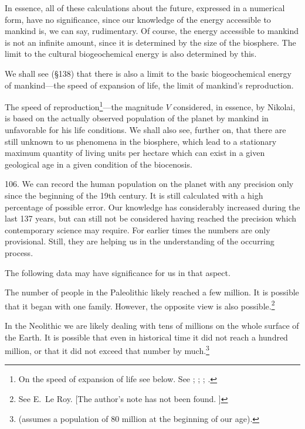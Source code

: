 In essence, all of these calculations about the future, expressed in a
numerical form, have no significance, since our knowledge of the energy
accessible to mankind is, we can say, rudimentary.  Of course, the energy
accessible to mankind is not an infinite amount, since it is determined by the
size of the biosphere.  The limit to the cultural biogeochemical energy is
also determined by this.

We shall see (§138) that there is also a limit to the basic biogeochemical
energy of mankind---the speed of expansion of life, the limit of mankind's
reproduction.

The speed of reproduction\footnote{
	On the speed of expansion of life see below.  See
	\foreignlanguage{french}{\cite{vernadsky1926etudes1}};
	\foreignlanguage{russian}{\cite[413--424, 437--444]{vernadsky1994zhivoe}};
	\foreignlanguage{russian}{\cite[118--125]{vernadsky1940biogeohimicheskie}};
	\foreignlanguage{russian}{\cite[Гл.~20]{vernadsky1965himicheskoe}.}
}---the magnitude $V$ considered, in essence, by Nikolai, is based on the
actually observed population of the planet by mankind in unfavorable for his
life conditions.  We shall also see, further on, that there are still unknown
to us phenomena in the biosphere, which lead to a stationary maximum quantity
of living units per hectare which can exist in a given geological age in a
given condition of the biocenosis.


106. We can record the human population on the planet with any precision only
since the beginning of the 19th century.  It is still calculated with a high
percentage of possible error.  Our knowledge has considerably increased during
the last 137 years, but can still not be considered having reached the
precision which contemporary science may require.  For earlier times the
numbers are only provisional.  Still, they are helping us in the understanding
of the occurring process.

The following data may have significance for us in that aspect.

The number of people in the Paleolithic likely reached a few million.  It is
possible that it began with one family.  However, the opposite view is also
possible.\footnote{See E.~Le Roy. [The author's note has not been found.
]}

In the Neolithic we are likely dealing with tens of millions on the whole
surface of the Earth.  It is possible that even in historical time it did not
reach a hundred million, or that it did not exceed that number by
much.\footnote{
	\cite{weinberg1922dvuhdesyatitysyachiletiyu-p21} (assumes a
	population of 80 million at the beginning of our age).}

